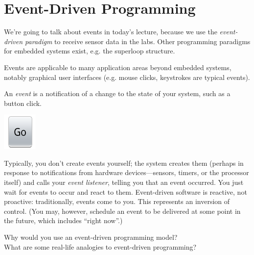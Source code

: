 



\section*{Event-Driven Programming}
We're going to talk about events in today's lecture, because we use
the \emph{event-driven paradigm} to receive sensor data in the labs.  Other programming paradigms for
embedded systems exist, e.g. the superloop structure.

Events are applicable to many application areas beyond embedded
systems, notably graphical user interfaces (e.g. mouse clicks,
keystrokes are typical events).

An \emph{event} is a notification of a change to the state of your system, such 
as a button click.

\begin{center}
\includegraphics{images/go-button}
\end{center}

Typically, you don't create events yourself; the system creates them
(perhaps in response to notifications from hardware devices---sensors,
timers, or the processor itself) and calls your \emph{event listener}, telling
you that an event occurred. You just wait for events to occur and react
to them. Event-driven software is reactive, not proactive:
traditionally, events come to you. This represents an 
inversion of control. (You may, however, schedule an event to be delivered
at some point in the future, which includes ``right now''.)



{\sf Why would you use an event-driven programming model?} \\[4em]

{\sf What are some real-life analogies to event-driven programming?}
~\\[4em]


